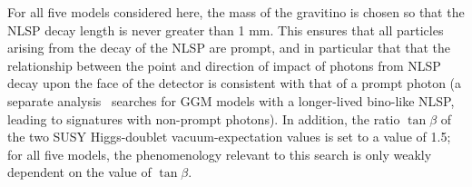 For all five models considered here, the mass of the gravitino is chosen so that
the NLSP decay length is never greater than 1 mm. This ensures that all
particles arising from the decay of the NLSP are prompt, and in particular that
that the relationship between the point and direction of impact
of photons from NLSP decay upon the face of the detector is
consistent with that of a prompt photon (a separate analysis~\cite{Aad:2014gfa}
searches for GGM models with a longer-lived bino-like NLSP, leading to signatures with non-prompt photons).
In addition, the ratio
$\tan \beta$ of the two SUSY Higgs-doublet vacuum-expectation values is set to a value of 1.5;
for all five models, the phenomenology relevant to this search is only
weakly dependent on the value of $\tan \beta$.
